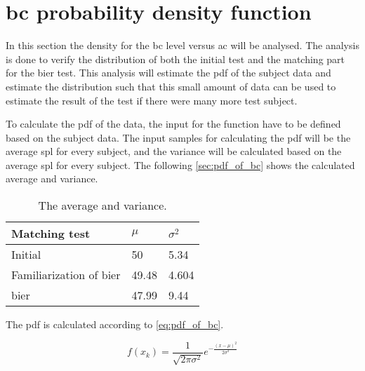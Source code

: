 \section{\gls{bc} probability density function}
In this section the density for the \gls{bc} level versus \gls{ac} will be analysed. The analysis is done to verify the distribution of both the initial test and the matching part for the \gls{bier} test. This analysis will estimate the \gls{pdf} of the subject data and estimate the distribution such that this small amount of data can be used to estimate the result of the test if there were many more test subject. 

To calculate the \gls{pdf} of the data, the input for the function have to be defined based on the subject data. The input samples for calculating the  \gls{pdf} will be the average \gls{spl} for every subject, and the variance will be calculated based on the average \gls{spl} for every subject. The following \autoref{sec:pdf_of_bc} shows the calculated average and variance.

\begin{table}[H]
\centering
\caption{The average and variance.}
\begin{tabular}{l|ll}
Matching test                 & $\mu$ & $\sigma^2$ \\ \hline
Initial                       & 50    & 5.34       \\
Familiarization of \gls{bier} & 49.48 & 4.604      \\
\gls{bier}                    & 47.99 & 9.44      
\end{tabular}
\label{sec:pdf_of_bc}
\end{table}

The \gls{pdf} is calculated according to  \autoref{eq:pdf_of_bc}.




\begin{equation}\label{eq:pdf_of_bc}
f(x_{k}) = \frac{1}{\sqrt{2 \pi \sigma^2}}e^{-\frac{(x-\mu)^2}{2\sigma^2}}
\end{equation}